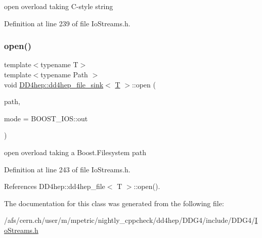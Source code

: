 open overload taking C-\/style string 



Definition at line 239 of file Io\+Streams.\+h.

\hypertarget{class_d_d4hep_1_1dd4hep__file__sink_a3909d844e3561c8527f7c2c47a6910b4}{}\label{class_d_d4hep_1_1dd4hep__file__sink_a3909d844e3561c8527f7c2c47a6910b4} 
\subsubsection{\texorpdfstring{open()}{open()}\hspace{0.1cm}{\footnotesize\ttfamily [4/4]}}
{\footnotesize\ttfamily template$<$typename T$>$ \\
template$<$typename Path $>$ \\
void \hyperlink{class_d_d4hep_1_1dd4hep__file__sink}{D\+D4hep\+::dd4hep\+\_\+file\+\_\+sink}$<$ \hyperlink{class_t}{T} $>$\+::open (\begin{DoxyParamCaption}\item[{const \hyperlink{class_d_d4hep_1_1_path}{Path} \&}]{path,  }\item[{B\+O\+O\+S\+T\+\_\+\+I\+O\+S\+::openmode}]{mode = {\ttfamily BOOST\+\_\+IOS\+:\+:out} }\end{DoxyParamCaption})\hspace{0.3cm}{\ttfamily [inline]}}



open overload taking a Boost.\+Filesystem path 



Definition at line 243 of file Io\+Streams.\+h.



References D\+D4hep\+::dd4hep\+\_\+file$<$ T $>$\+::open().



The documentation for this class was generated from the following file\+:\begin{DoxyCompactItemize}
\item 
/afs/cern.\+ch/user/m/mpetric/nightly\+\_\+cppcheck/dd4hep/\+D\+D\+G4/include/\+D\+D\+G4/\hyperlink{_io_streams_8h}{Io\+Streams.\+h}\end{DoxyCompactItemize}

